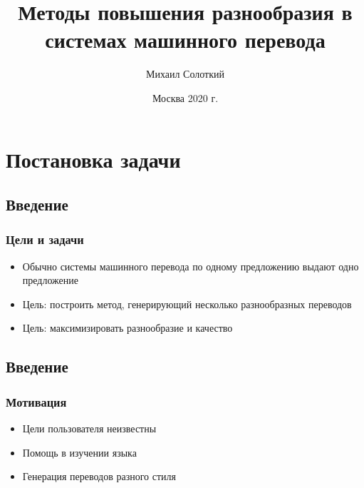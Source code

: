 \documentclass[unicode]{beamer}
\title[]{Методы повышения разнообразия в системах машинного перевода}
\author{Михаил Солоткий}
\institute[ФКН ВШЭ] %
{
    НИУ Высшая Школа Экономики \\
    Факультет компьютерных наук \\
    Базовая кафедра Яндекса \\
    \bigskip
    {\bf Курсовая работа} \\
    \bigskip
    Научный руководитель --- Бабенко Максим Александрович
    \bigskip
}
\date{Москва 2020 г.} %
\begin{document}
\begin{frame}
\titlepage %
\end{frame}


\section{Постановка задачи}

\subsection{Введение}
\begin{frame}
\frametitle{Цели и задачи}
\begin{itemize}
    \item Обычно системы машинного перевода по одному предложению выдают одно предложение \newline
    \item Цель: построить метод, генерирующий несколько разнообразных переводов \newline
    \item Цель: максимизировать разнообразие и качество \newline
\end{itemize}
\end{frame}

\subsection{Введение}
\begin{frame}
\frametitle{Мотивация}
\begin{itemize}
    \item Цели пользователя неизвестны \newline
    \item Помощь в изучении языка \newline
    \item Генерация переводов разного стиля \newline
\end{itemize}
\end{frame}
\end{document}
